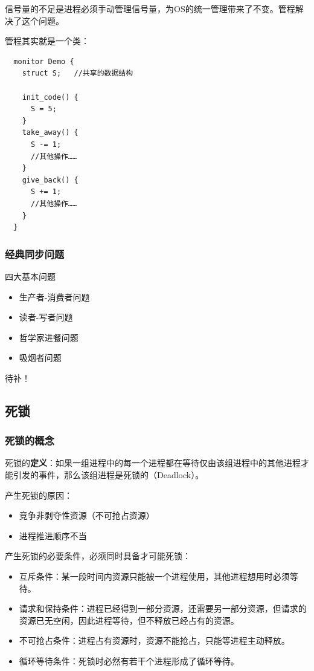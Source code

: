 \documentclass[12pt, a4paper, oneside]{ctexart}
\begin{document}
信号量的不足是进程必须手动管理信号量，为OS的统一管理带来了不变。管程解决了这个问题。

管程其实就是一个类：
\begin{lstlisting}
  monitor Demo {
    struct S;   //共享的数据结构
    
    init_code() {
      S = 5;
    }
    take_away() {
      S -= 1;
      //其他操作……
    }
    give_back() {
      S += 1;
      //其他操作……
    }
  }
\end{lstlisting}

\subsubsection{经典同步问题}

四大基本问题
\begin{itemize}
  \item 生产者-消费者问题
  \item 读者-写者问题
  \item 哲学家进餐问题
  \item 吸烟者问题
\end{itemize}

待补！

\subsection{死锁}

\subsubsection{死锁的概念}

死锁的\textbf{定义}：如果一组进程中的每一个进程都在等待仅由该组进程中的其他进程才能引发的事件，那么该组进程是死锁的（Deadlock）。

产生死锁的原因：
\begin{itemize}
  \item 竞争非剥夺性资源（不可抢占资源）
  \item 进程推进顺序不当
\end{itemize}

产生死锁的必要条件，必须同时具备才可能死锁：
\begin{itemize}
  \item 互斥条件：某一段时间内资源只能被一个进程使用，其他进程想用时必须等待。
  \item 请求和保持条件：进程已经得到一部分资源，还需要另一部分资源，但请求的资源已无空闲，因此进程等待，但不释放已经占有的资源。
  \item 不可抢占条件：进程占有资源时，资源不能抢占，只能等进程主动释放。
  \item 循环等待条件：死锁时必然有若干个进程形成了循环等待。
\end{itemize}
\end{document}
